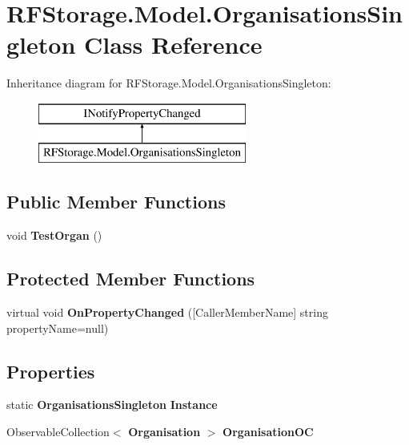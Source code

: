 \section{R\+F\+Storage.\+Model.\+Organisations\+Singleton Class Reference}
\label{class_r_f_storage_1_1_model_1_1_organisations_singleton}
Inheritance diagram for R\+F\+Storage.\+Model.\+Organisations\+Singleton\+:\begin{figure}[H]
\begin{center}
\leavevmode
\includegraphics[height=2.000000cm]{class_r_f_storage_1_1_model_1_1_organisations_singleton}
\end{center}
\end{figure}
\subsection*{Public Member Functions}
\begin{DoxyCompactItemize}
\item 
\mbox{\label{class_r_f_storage_1_1_model_1_1_organisations_singleton_a63e52d0172e288a8b7eae8abd0c2acfd}} 
void {\bfseries Test\+Organ} ()
\end{DoxyCompactItemize}
\subsection*{Protected Member Functions}
\begin{DoxyCompactItemize}
\item 
\mbox{\label{class_r_f_storage_1_1_model_1_1_organisations_singleton_a845177f73909cfe84c4656405a25d6d0}} 
virtual void {\bfseries On\+Property\+Changed} ([Caller\+Member\+Name] string property\+Name=null)
\end{DoxyCompactItemize}
\subsection*{Properties}
\begin{DoxyCompactItemize}
\item 
\mbox{\label{class_r_f_storage_1_1_model_1_1_organisations_singleton_a90156b767153cdffc9babd801ca5ec70}} 
static \textbf{ Organisations\+Singleton} {\bfseries Instance}\hspace{0.3cm}{\ttfamily  [get]}
\item 
\mbox{\label{class_r_f_storage_1_1_model_1_1_organisations_singleton_aca042115685c93582fc2087e0a8c20e3}} 
Observable\+Collection$<$ \textbf{ Organisation} $>$ {\bfseries Organisation\+OC}\hspace{0.3cm}{\ttfamily  [get, set]}
\end{DoxyCompactItemize}
